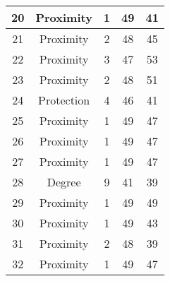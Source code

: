 \documentclass[results.tex]{subfiles}
\begin{document}
\begin{center}
\begin{tabular}{| c || c | c | c | c |}
            \hline
            20                      & Proximity                    & 1                      & 49                      & 41                   \\
            \hline
            21                      & Proximity                    & 2                      & 48                      & 45                   \\
            \hline
            22                      & Proximity                    & 3                      & 47                      & 53                   \\
            \hline
            23                      & Proximity                    & 2                      & 48                      & 51                   \\
            \hline
            24                      & Protection                   & 4                      & 46                      & 41                   \\
            \hline
            25                      & Proximity                    & 1                      & 49                      & 47                   \\
            \hline
            26                      & Proximity                    & 1                      & 49                      & 47                   \\
            \hline
            27                      & Proximity                    & 1                      & 49                      & 47                   \\
            \hline
            28                      & Degree                       & 9                      & 41                      & 39                   \\
            \hline
            29                      & Proximity                    & 1                      & 49                      & 49                   \\
            \hline
            30                      & Proximity                    & 1                      & 49                      & 43                   \\
            \hline
            31                      & Proximity                    & 2                      & 48                      & 39                   \\
            \hline
            32                      & Proximity                    & 1                      & 49                      & 47                   \\

\end{tabular}
\end{center}
\end{document}
